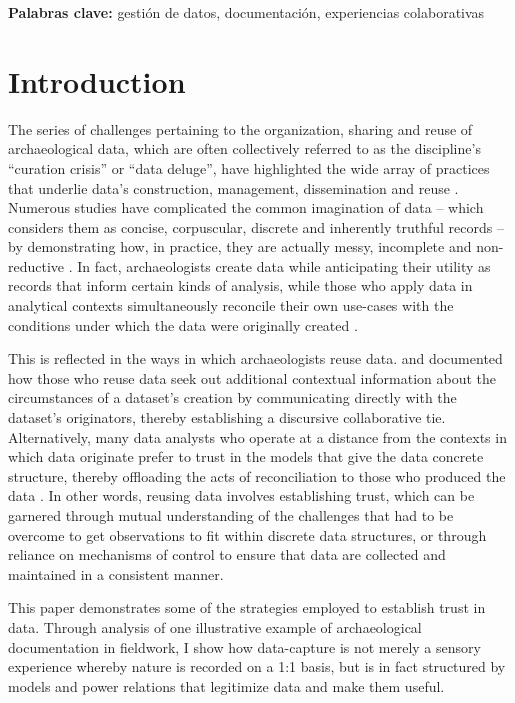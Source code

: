 \documentclass{article}
\begin{document}
\noindent
\textbf{Palabras clave:} {gestión de datos, documentación, experiencias colaborativas}\\

\newpage

\section{Introduction}
The series of challenges pertaining to the organization, sharing and
reuse of archaeological data, which are often collectively referred to
as the discipline's ``curation crisis'' or ``data deluge'', have
highlighted the wide array of practices that underlie data's
construction, management, dissemination and reuse
\parencites{bevan2012a,huggett2022,huggett2022a}. Numerous studies have
complicated the common imagination of data -- which considers them as
concise, corpuscular, discrete and inherently truthful records -- by
demonstrating how, in practice, they are actually messy, incomplete and
non-reductive
\parencites[cf.][]{batist2024a,dallas2015,huggett2022a,voss2012}. In
fact, archaeologists create data while anticipating their utility as
records that inform certain kinds of analysis, while those who apply
data in analytical contexts simultaneously reconcile their own use-cases
with the conditions under which the data were originally created
\parencite[190-191]{dallas2015}.

This is reflected in the ways in which archaeologists reuse data.
\textcite{faniel2013} and \textcite{atici2013} documented how those who
reuse data seek out additional contextual information about the
circumstances of a dataset's creation by communicating directly with the
dataset's originators, thereby establishing a discursive collaborative
tie. Alternatively, many data analysts who operate at a distance from
the contexts in which data originate prefer to trust in the models that
give the data concrete structure, thereby offloading the acts of
reconciliation to those who produced the data \parencite{huggett2022}. In
other words, reusing data involves establishing trust, which can be
garnered through mutual understanding of the challenges that had to be
overcome to get observations to fit within discrete data structures, or
through reliance on mechanisms of control to ensure that data are
collected and maintained in a consistent manner.

This paper demonstrates some of the strategies employed to establish
trust in data. Through analysis of one illustrative example of
archaeological documentation in fieldwork, I show how data-capture is
not merely a sensory experience whereby nature is recorded on a 1:1
basis, but is in fact structured by models and power relations that
legitimize data and make them useful.
\end{document}
